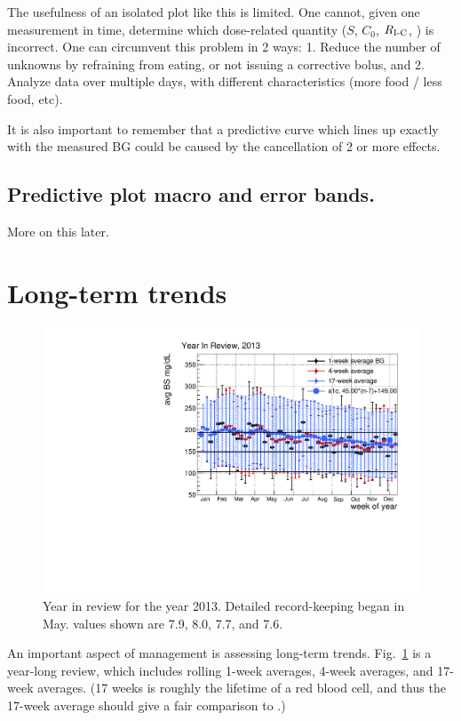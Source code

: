 The usefulness of an isolated plot like this is limited. One cannot, given one measurement in time, 
determine which dose-related quantity ($S$, $C_0$, $R_\text{I-C}$, \rbas) is incorrect. One can circumvent 
this problem in 2 ways: 1. Reduce the number of unknowns by refraining from eating, or not issuing 
a corrective bolus, and 2. Analyze data over multiple days, with different characteristics (more 
food / less food, etc). 

It is also important to remember that a predictive curve which lines up exactly with the measured 
BG could be caused by the cancellation of 2 or more effects.

\subsection{Predictive plot macro and error bands.} More on this later.

\section{Long-term trends}

\begin{figure}[htbp]
\begin{center}
\includegraphics[width=4.5in]{figures/year_in_review_2013.pdf}
\caption{Year in review for the year 2013. Detailed record-keeping began in May.
\hbac values shown are 7.9, 8.0, 7.7, and 7.6.
}
\label{fig:year}
\end{center}
\end{figure}

An important aspect of management is assessing long-term trends. Fig.~\ref{fig:year} is a year-long 
review, which includes rolling 1-week averages, 4-week averages, and 17-week averages. (17 weeks is 
roughly the lifetime of a red blood cell, and thus the 17-week average should give a fair comparison 
to \hbac.) 

